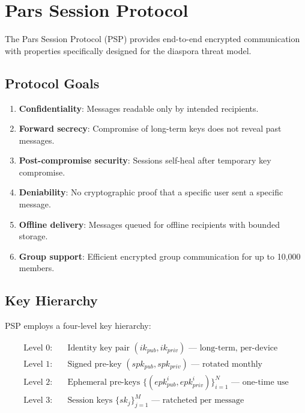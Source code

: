 \documentclass[11pt,a4paper]{article}
\begin{document}
\section{Pars Session Protocol}
\label{sec:session}

The Pars Session Protocol (PSP) provides end-to-end encrypted communication with properties specifically designed for the diaspora threat model.

\subsection{Protocol Goals}

\begin{enumerate}
    \item \textbf{Confidentiality}: Messages readable only by intended recipients.
    \item \textbf{Forward secrecy}: Compromise of long-term keys does not reveal past messages.
    \item \textbf{Post-compromise security}: Sessions self-heal after temporary key compromise.
    \item \textbf{Deniability}: No cryptographic proof that a specific user sent a specific message.
    \item \textbf{Offline delivery}: Messages queued for offline recipients with bounded storage.
    \item \textbf{Group support}: Efficient encrypted group communication for up to 10{,}000 members.
\end{enumerate}

\subsection{Key Hierarchy}

PSP employs a four-level key hierarchy:

\begin{align}
\text{Level 0:} & \quad \text{Identity key pair } (ik_{pub}, ik_{priv}) \text{ --- long-term, per-device} \\
\text{Level 1:} & \quad \text{Signed pre-key } (spk_{pub}, spk_{priv}) \text{ --- rotated monthly} \\
\text{Level 2:} & \quad \text{Ephemeral pre-keys } \{(epk^i_{pub}, epk^i_{priv})\}_{i=1}^{N} \text{ --- one-time use} \\
\text{Level 3:} & \quad \text{Session keys } \{sk_j\}_{j=1}^{M} \text{ --- ratcheted per message}
\end{align}
\end{document}
